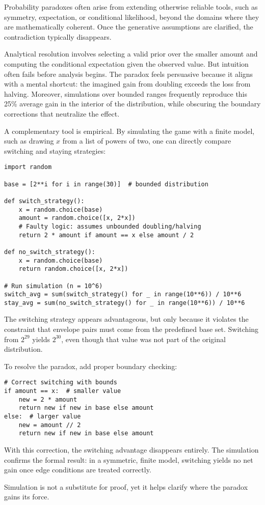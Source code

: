 \begin{commentary}
Probability paradoxes often arise from extending otherwise reliable tools, such as symmetry, expectation, or conditional likelihood, beyond the domains where they are mathematically coherent. Once the generative assumptions are clarified, the contradiction typically disappears.

Analytical resolution involves selecting a valid prior over the smaller amount and computing the conditional expectation given the observed value. But intuition often fails before analysis begins. The paradox feels persuasive because it aligns with a mental shortcut: the imagined gain from doubling exceeds the loss from halving. Moreover, simulations over bounded ranges frequently reproduce this 25\% average gain in the interior of the distribution, while obscuring the boundary corrections that neutralize the effect.

A complementary tool is empirical. By simulating the game with a finite model, such as drawing $x$ from a list of powers of two, one can directly compare switching and staying strategies:

\begin{verbatim}
import random

base = [2**i for i in range(30)]  # bounded distribution

def switch_strategy():
    x = random.choice(base)
    amount = random.choice([x, 2*x])
    # Faulty logic: assumes unbounded doubling/halving
    return 2 * amount if amount == x else amount / 2

def no_switch_strategy():
    x = random.choice(base)
    return random.choice([x, 2*x])

# Run simulation (n = 10^6)
switch_avg = sum(switch_strategy() for _ in range(10**6)) / 10**6
stay_avg = sum(no_switch_strategy() for _ in range(10**6)) / 10**6
\end{verbatim}

The switching strategy appears advantageous, but only because it violates the constraint that envelope pairs must come from the predefined base set. Switching from \( 2^{29} \) yields \( 2^{30} \), even though that value was not part of the original distribution.

To resolve the paradox, add proper boundary checking:

\begin{verbatim}
# Correct switching with bounds
if amount == x:  # smaller value
    new = 2 * amount
    return new if new in base else amount
else:  # larger value  
    new = amount // 2
    return new if new in base else amount
\end{verbatim}

With this correction, the switching advantage disappears entirely. The simulation confirms the formal result: in a symmetric, finite model, switching yields no net gain once edge conditions are treated correctly.

Simulation is not a substitute for proof, yet it helps clarify where the paradox gains its force.

\end{commentary}
